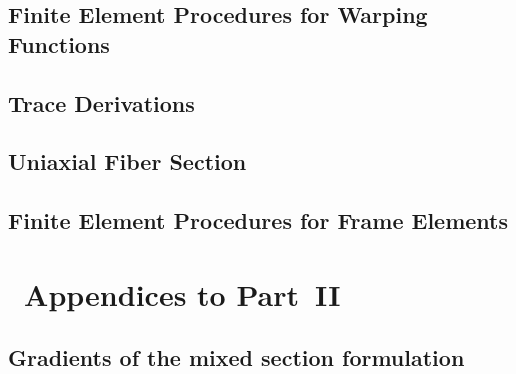 \begin{Notation}[section]
\begin{appendices}

\clearpage






\clearpage

\chapter{Finite Element Procedures for Warping Functions}

\clearpage 



\clearpage


\chapter{Trace Derivations}

\clearpage

\clearpage 


\chapter{Uniaxial Fiber Section}\label{sec:uniaxial-section}



\chapter{Finite Element Procedures for Frame Elements}\label{sec:ForceFrame}

\clearpage
% 

% 
% 

\end{appendices}

\part{~Appendices to Part~II}

\begin{appendices}

\chapter{Gradients of the mixed section formulation}


%
\clearpage 






\end{appendices}
\end{Notation}



